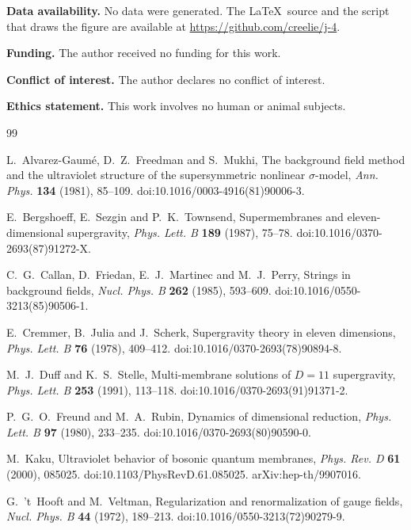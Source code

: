 \documentclass[11pt]{amsart}
\theoremstyle{definition}
\begin{document}
\noindent\textbf{Data availability.} No data were generated. The \LaTeX\ source and the script that draws the figure are available at \url{https://github.com/creelie/j-4}.

\smallskip\noindent\textbf{Funding.} The author received no funding for this work.

\smallskip\noindent\textbf{Conflict of interest.} The author declares no conflict of interest.

\smallskip\noindent\textbf{Ethics statement.} This work involves no human or animal subjects.

\begin{thebibliography}{99}

 L.~Alvarez-Gaum\'e, D.~Z.~Freedman and S.~Mukhi, The background field method and the ultraviolet structure of the supersymmetric nonlinear $\sigma$-model, \emph{Ann. Phys.} \textbf{134} (1981), 85--109. doi:10.1016/0003-4916(81)90006-3.

 E.~Bergshoeff, E.~Sezgin and P.~K.~Townsend, Supermembranes and eleven-dimensional supergravity, \emph{Phys. Lett. B} \textbf{189} (1987), 75--78. doi:10.1016/0370-2693(87)91272-X.

 C.~G.~Callan, D.~Friedan, E.~J.~Martinec and M.~J.~Perry, Strings in background fields, \emph{Nucl. Phys. B} \textbf{262} (1985), 593--609. doi:10.1016/0550-3213(85)90506-1.

 E.~Cremmer, B.~Julia and J.~Scherk, Supergravity theory in eleven dimensions, \emph{Phys. Lett. B} \textbf{76} (1978), 409--412. doi:10.1016/0370-2693(78)90894-8.

 M.~J.~Duff and K.~S.~Stelle, Multi-membrane solutions of $D=11$ supergravity, \emph{Phys. Lett. B} \textbf{253} (1991), 113--118. doi:10.1016/0370-2693(91)91371-2.

 P.~G.~O.~Freund and M.~A.~Rubin, Dynamics of dimensional reduction, \emph{Phys. Lett. B} \textbf{97} (1980), 233--235. doi:10.1016/0370-2693(80)90590-0.

 M.~Kaku, Ultraviolet behavior of bosonic quantum membranes, \emph{Phys. Rev. D} \textbf{61} (2000), 085025. doi:10.1103/PhysRevD.61.085025. arXiv:hep-th/9907016.

 G.~'t~Hooft and M.~Veltman, Regularization and renormalization of gauge fields, \emph{Nucl. Phys. B} \textbf{44} (1972), 189--213. doi:10.1016/0550-3213(72)90279-9.

\end{thebibliography}
\end{document}
